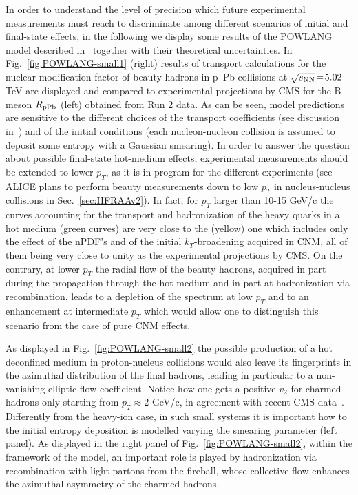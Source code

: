 In order to understand the level of precision which future experimental measurements must reach to discriminate among different scenarios of initial and final-state effects, in the following we display some results of the POWLANG model described in~\cite{Beraudo:2015wsd} together with their theoretical uncertainties.
In Fig.~\ref{fig:POWLANG-small1} (right) results of transport calculations for the nuclear modification factor of beauty hadrons in p--Pb collisions at $\sqrt{s_{\rm NN}}\!=\!5.02$ TeV  are displayed and compared to experimental projections by CMS for the B-meson $R_{\rm pPb}$ (left) obtained from Run 2 data. As can be seen, model predictions are sensitive to the different choices of the transport coefficients (see discussion in~\cite{Beraudo:2015wsd}) and of the initial conditions (each nucleon-nucleon collision is assumed to deposit some entropy with a Gaussian smearing). In order to answer the question about possible final-state hot-medium effects, experimental measurements should be extended to lower $p_T$, as it is in program for the different experiments (see ALICE plans to perform beauty measurements down to low $p_T$ in nucleus-nucleus collisions in Sec.~\ref{sec:HFRAAv2}). In fact, for $p_T$ larger than 10-15 GeV/c the curves accounting for the transport and hadronization of the heavy quarks in a hot medium (green curves) are very close to the (yellow) one which includes only the effect of the nPDF's and of the initial $k_T$-broadening acquired in CNM, all of them being very close to unity as the experimental projections by CMS. On the contrary, at lower $p_T$ the radial flow of the beauty hadrons, acquired in part during the propagation through the hot medium and in part at hadronization via recombination, leads to a depletion of the spectrum at low $p_T$ and to an enhancement at intermediate $p_T$ which would allow one to distinguish this scenario from the case of pure CNM effects. 

As displayed in Fig.~\ref{fig:POWLANG-small2} the possible production of a hot deconfined medium in proton-nucleus collisions would also leave its fingerprints in the azimuthal distribution of the final hadrons, leading in particular to a non-vanishing elliptic-flow coefficient. Notice how one gets a positive $v_2$ for charmed hadrons only starting from $p_T\!\approx\!2$ GeV/c, in agreement with recent CMS data~\cite{Sirunyan:2018toe}. Differently from the heavy-ion case, in such small systems it is important how to the initial entropy deposition is modelled varying the smearing parameter (left panel). As displayed in the right panel of Fig.~\ref{fig:POWLANG-small2}, within the framework of the model, an important role is played by hadronization via recombination with light partons from the fireball, whose collective flow enhances the azimuthal asymmetry of the charmed hadrons.

